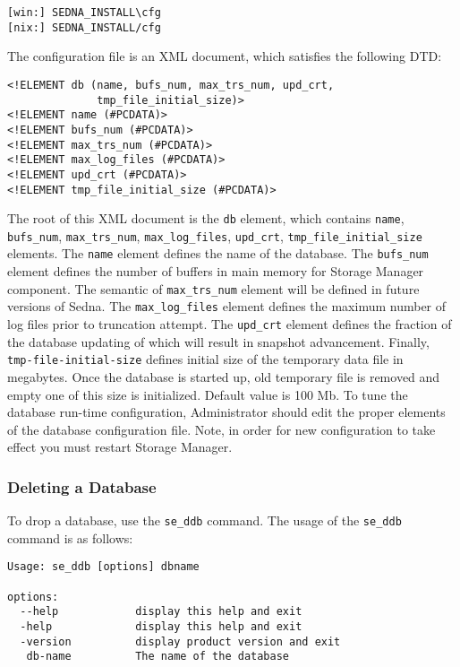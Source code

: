 \documentclass[a4paper,12pt]{article}
\begin{document}
\begin{verbatim}
[win:] SEDNA_INSTALL\cfg
[nix:] SEDNA_INSTALL/cfg
\end{verbatim}

The configuration file is an XML document, which satisfies the following DTD:

\small{
\begin{verbatim}
<!ELEMENT db (name, bufs_num, max_trs_num, upd_crt,
              tmp_file_initial_size)>
<!ELEMENT name (#PCDATA)>
<!ELEMENT bufs_num (#PCDATA)>
<!ELEMENT max_trs_num (#PCDATA)>
<!ELEMENT max_log_files (#PCDATA)>
<!ELEMENT upd_crt (#PCDATA)>
<!ELEMENT tmp_file_initial_size (#PCDATA)>
\end{verbatim}}

The root of this XML document is the \verb!db! element, which contains
\verb!name!, \verb!bufs_num!, \verb!max_trs_num!, \verb!max_log_files!,
\verb!upd_crt!, \verb!tmp_file_initial_size! elements. The \verb!name! element
defines the name of the database. The \verb!bufs_num! element defines the number
of buffers in main memory for Storage Manager component. The semantic of
\verb!max_trs_num! element will be defined in future versions of Sedna. The
\verb!max_log_files! element defines the maximum number of log files prior to
truncation attempt. The \verb!upd_crt! element defines the fraction of the
database updating of which will result in snapshot advancement. Finally,
\verb!tmp-file-initial-size! defines initial size of the temporary data file in
megabytes. Once the database is started up, old temporary file is removed and
empty one of this size is initialized. Default value is 100 Mb.
To tune the database run-time configuration, Administrator should edit the
proper elements of the database configuration file. Note, in order for new
configuration to take effect you must restart Storage Manager.


\subsubsection{Deleting a Database}

To drop a database, use the \verb!se_ddb! command. The usage of the
\verb!se_ddb! command is as follows:

\small{
\begin{verbatim}
Usage: se_ddb [options] dbname

options:
  --help            display this help and exit
  -help             display this help and exit
  -version          display product version and exit
   db-name          The name of the database
\end{verbatim}}
\end{document}
